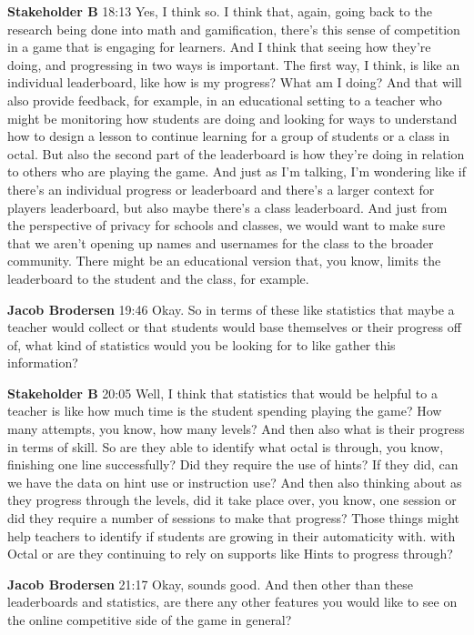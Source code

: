 \documentclass{article}
\begin{document}
\noindent \textbf{Stakeholder B}   18:13
Yes, I think so. I think that, again, going back to the research being done into math and gamification, there's this sense of competition in a game that is engaging for learners. And I think that seeing how they're doing,
and progressing in two ways is important. The first way, I think, is like an individual leaderboard, like how is my progress? What am I doing? And that will also provide feedback, for example, in an educational setting to a teacher who might be monitoring how students are doing and looking for ways
to understand how to design a lesson to continue learning for a group of students or a class in octal. But also the second part of the leaderboard is how they're doing in relation to others who are playing the game. And just as I'm talking, I'm wondering like if there's an individual
progress or leaderboard and there's a larger context for players leaderboard, but also maybe there's a class leaderboard. And just from the perspective of privacy for schools and classes, we would want to make sure that we aren't opening up names and usernames
for the class to the broader community. There might be an educational version that, you know, limits the leaderboard to the student and the class, for example.

\noindent \textbf{Jacob Brodersen}   19:46
Okay.
So in terms of these like statistics that maybe a teacher would collect or that students would base themselves or their progress off of, what kind of statistics would you be looking for to like gather this information?

\noindent \textbf{Stakeholder B}   20:05
Well, I think that statistics that would be helpful to a teacher is like how much time is the student spending playing the game? How many attempts, you know, how many levels? And then also what is their progress in terms of
skill. So are they able to identify what octal is through, you know, finishing one line successfully? Did they require the use of hints? If they did, can we have the data on hint use or instruction use?
And then also thinking about as they progress through the levels, did it take place over, you know, one session or did they require a number of sessions to make that progress? Those things might help teachers to identify if students are
growing in their automaticity with.
with Octal or are they continuing to rely on supports like Hints to progress through?

\noindent \textbf{Jacob Brodersen}   21:17
Okay, sounds good. And then other than these leaderboards and statistics, are there any other features you would like to see on the online competitive side of the game in general?
\end{document}
